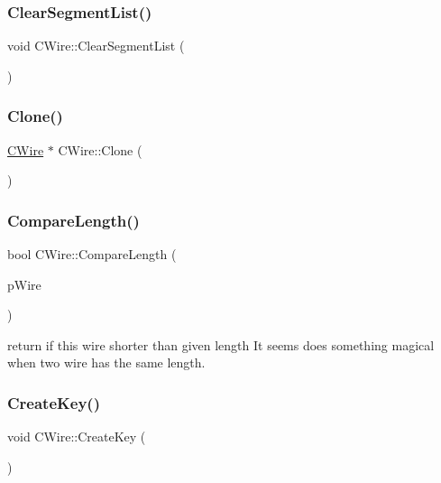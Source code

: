 \mbox{\label{classCWire_a1d2f3795ad3fb276a22eaf5a10b89a36}} 
\subsubsection{\texorpdfstring{ClearSegmentList()}{ClearSegmentList()}}
{\footnotesize\ttfamily void C\+Wire\+::\+Clear\+Segment\+List (\begin{DoxyParamCaption}{ }\end{DoxyParamCaption})}

\mbox{\label{classCWire_a79a2ddae76fd8d2e0a96309077d5a550}} 
\subsubsection{\texorpdfstring{Clone()}{Clone()}}
{\footnotesize\ttfamily \mbox{\hyperlink{classCWire}{C\+Wire}} $\ast$ C\+Wire\+::\+Clone (\begin{DoxyParamCaption}{ }\end{DoxyParamCaption})}

\mbox{\label{classCWire_a683449c62b5625b17a78f12274d4a601}} 
\subsubsection{\texorpdfstring{CompareLength()}{CompareLength()}}
{\footnotesize\ttfamily bool C\+Wire\+::\+Compare\+Length (\begin{DoxyParamCaption}\item[{\mbox{\hyperlink{classCWire}{C\+Wire}} $\ast$}]{p\+Wire }\end{DoxyParamCaption})}

return if this wire shorter than given length It seems does something magical when two wire has the same length. \mbox{\label{classCWire_a6ed15ca71f29273eed927d88c87535b0}} 
\subsubsection{\texorpdfstring{CreateKey()}{CreateKey()}}
{\footnotesize\ttfamily void C\+Wire\+::\+Create\+Key (\begin{DoxyParamCaption}{ }\end{DoxyParamCaption})}

